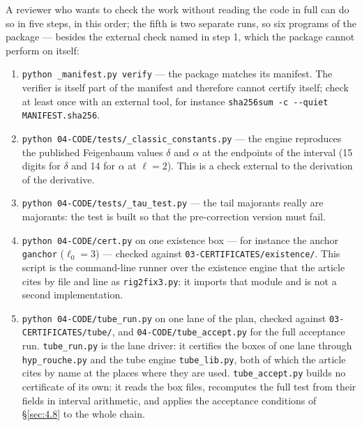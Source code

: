 A reviewer who wants to check the work without reading the code in full can do
so in five steps, in this order; the fifth is two separate runs, so six
programs of the package --- besides the external check named in step 1, which
the package cannot perform on itself:

\begin{enumerate}
\item \texttt{python \_\allowbreak manifest.py verify} --- the package matches its manifest.
  The verifier is itself part of the manifest and therefore cannot certify
  itself; check at least once with an external tool, for instance
  \texttt{sha256sum -c -{}-quiet MANIFEST.sha256}.
\item \texttt{python 04-\allowbreak CODE/\allowbreak tests/\allowbreak \_\allowbreak classic\_\allowbreak constants.py} --- the engine reproduces
  the published Feigenbaum values $\delta$ and $\alpha$ at the endpoints of the
  interval (15 digits for $\delta$ and 14 for $\alpha$ at $\ell = 2$). This is a check external to the
  derivation of the derivative.
\item \texttt{python 04-\allowbreak CODE/\allowbreak tests/\allowbreak \_\allowbreak tau\_\allowbreak test.py} --- the tail majorants really are
  majorants: the test is built so that the pre-correction version must fail.
\item \texttt{python 04-\allowbreak CODE/\allowbreak cert.py} on one existence box --- for instance
  the anchor \texttt{ganchor} ($\ell_{0} = 3$) --- checked against
  \texttt{03-\allowbreak CERTIFICATES/\allowbreak existence/\allowbreak }. This script is the
  command-line runner over the existence engine that the article cites by file
  and line as \texttt{rig2fix3.py}: it imports that module and is not a second
  implementation.
\item \texttt{python 04-\allowbreak CODE/\allowbreak tube\_\allowbreak run.py} on one lane of the plan, checked
  against \texttt{03-\allowbreak CERTIFICATES/\allowbreak tube/\allowbreak }, and
  \texttt{04-\allowbreak CODE/\allowbreak tube\_\allowbreak accept.py} for the full acceptance run.
  \texttt{tube\_\allowbreak run.py} is the lane driver: it certifies the boxes of one lane
  through \texttt{hyp\_\allowbreak rouche.py} and the tube engine \texttt{tube\_\allowbreak lib.py}, both
  of which the article cites by name at the places where they are used.
  \texttt{tube\_\allowbreak accept.py} builds no
  certificate of its own: it reads the box files, recomputes the full test from
  their fields in interval arithmetic, and applies the acceptance conditions of
  \S\ref{sec:4.8} to the whole chain.
\end{enumerate}

